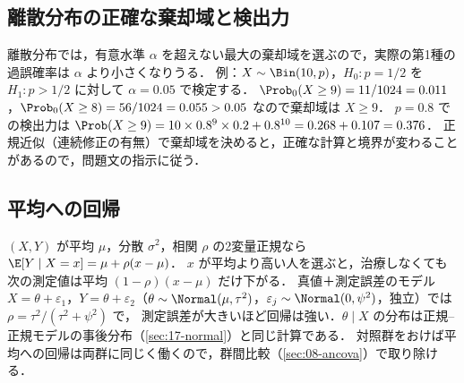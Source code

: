 \subsection{離散分布の正確な棄却域と検出力}\label{subsec:G-exact}
離散分布では，有意水準 $\alpha$ を超えない最大の棄却域を選ぶので，実際の第1種の過誤確率は $\alpha$ より小さくなりうる．
例：$X\sim\Bin(10,p)$，$H_0:p=1/2$ を $H_1:p>1/2$ に対して $\alpha=0.05$ で検定する．
$\Prob_0(X\ge9)=11/1024=0.011$，$\Prob_0(X\ge8)=56/1024=0.055>0.05$ なので棄却域は $X\ge9$．
$p=0.8$ での検出力は $\Prob(X\ge9)=10\times0.8^9\times0.2+0.8^{10}=0.268+0.107=0.376$．
正規近似（連続修正の有無）で棄却域を決めると，正確な計算と境界が変わることがあるので，問題文の指示に従う．

\subsection{平均への回帰}\label{subsec:G-rtm}
$(X,Y)$ が平均 $\mu$，分散 $\sigma^2$，相関 $\rho$ の2変量正規なら $\E[Y\mid X=x]=\mu+\rho(x-\mu)$．
$x$ が平均より高い人を選ぶと，治療しなくても次の測定値は平均 $(1-\rho)(x-\mu)$ だけ下がる．
真値＋測定誤差のモデル $X=\theta+\varepsilon_1$，$Y=\theta+\varepsilon_2$（$\theta\sim\Normal(\mu,\tau^2)$，$\varepsilon_j\sim\Normal(0,\psi^2)$，独立）では $\rho=\tau^2/(\tau^2+\psi^2)$ で，
測定誤差が大きいほど回帰は強い．$\theta\mid X$ の分布は正規--正規モデルの事後分布（\cref{sec:17-normal}）と同じ計算である．
対照群をおけば平均への回帰は両群に同じく働くので，群間比較（\cref{sec:08-ancova}）で取り除ける．

